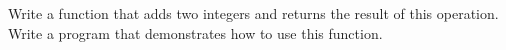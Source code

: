 Write a function that adds two integers and returns the result of this operation. Write a program that demonstrates how to use this function.
